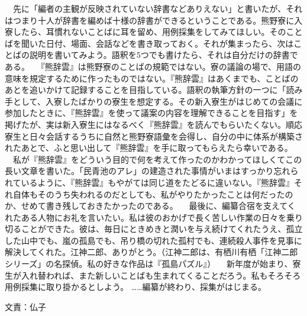 　先に「編者の主観が反映されていない辞書などありえない」と書いたが、それはつまり十人が辞書を編めば十様の辞書ができるということである。熊野寮に入寮したら、耳慣れないことばに耳を留め、用例採集をしてみてほしい。そのことばを聞いた日付、場面、会話などを書き取っておく。それが集まったら、次はことばの説明を書いてみよう。語釈を5つでも書けたら、それは自分だけの辞書である。
　『熊辞雲』は熊野寮のことばの規範ではない。寮の議論の場で、用語の意味を規定するために作ったものではない。『熊辞雲』はあくまでも、ことばのあとを追いかけて記録することを目指している。語釈の執筆方針の一つに「読み手として、入寮したばかりの寮生を想定する。その新入寮生がはじめての会議に参加したときに、『熊辞雲』を使って議案の内容を理解できることを目指す」を掲げたが、実は新入寮生にはなるべく『熊辞雲』を読んでもらいたくない。順応寮生と日々会話するうちに自然と熊野寮語彙を会得し、自分の中に体系が構築されたあとで、ふと思い出して『熊辞雲』を手に取ってもらえたら幸いである。
　私が『熊辞雲』をどういう目的で何を考えて作ったのかわかってほしくてこの長い文章を書いた。「民青池のアレ」の建造された事情がいまはすっかり忘れられているように、『熊辞雲』もやがては同じ道をたどるに違いない。『熊辞雲』それ自体もそのうち失われるのだとしても、私がやりたかったことは何だったのか、せめて書き残しておきたかったのである。
　最後に、編纂合宿を支えてくれたある人物にお礼を言いたい。私は彼のおかげで長く苦しい作業の日々を乗り切ることができた。彼は、毎日にときめきと潤いを与え続けてくれたうえ、孤立した山中でも、嵐の孤島でも、吊り橋の切れた孤村でも、連続殺人事件を見事に解決してくれた。江神二郎、ありがとう。（江神二郎は、有栖川有栖「江神二郎シリーズ」の名探偵。私の好きな作品は『孤島パズル』）
　新年度が始まり、寮生が入れ替われば、また新しいことばも生まれてくることだろう。私もそろそろ用例採集に取り掛かるとしよう。
……編纂が終わり、採集がはじまる。　


文責：仏子